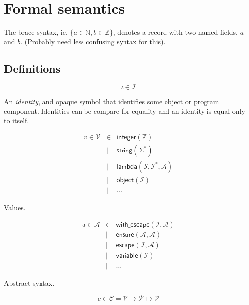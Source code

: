 \documentclass{article}
\begin{document}
\newcommand{\op}[1]{\mathsf{#1}}
\newcommand{\cnt}{c}
\newcommand{\scst}{\sigma}
\newcommand{\dyst}{\delta}
\newcommand{\pest}{\pi}
\newcommand{\sym}{\iota}
\newcommand{\prop}[1]{\mathsf{#1}}
\newcommand{\fun}[1]{\mathsf{#1}}
\newcommand{\type}[1]{\mathcal{#1}}
\newcommand{\val}[1]{\mathsf{#1}}
\newcommand{\eval}{\mathcal{E}}
\newcommand{\syn}[1]{\mathsf{#1}}
\newcommand{\bif}{\quad \mathbf{if} \quad}

\section{Formal semantics}

The brace syntax, ie. $\{ a \in \mathbb{N}, b \in \mathbb{Z} \}$, denotes a
record with two named fields, $a$ and $b$. (Probably need less confusing syntax
for this).

\subsection{Definitions}

\[ \iota \in \type{I} \]

An \emph{identity}, and opaque symbol that identifies some object or program
component. Identities can be compare for equality and an identity is equal only
to itself.

\begin{eqnarray*}
v \in \type{V}
& \in & \val{integer}(\mathbb{Z}) \\
& | & \val{string}(\Sigma^*) \\
& | & \val{lambda}(\type{S}, \type{I}^*, \type{A}) \\
& | & \val{object}(\type{I}) \\
& | & \ldots
\end{eqnarray*}

Values.

\begin{eqnarray*}
a \in \type{A}
& \in & \syn{with\_escape}(\type{I}, \type{A}) \\
& | & \syn{ensure}(\type{A}, \type{A}) \\
& | & \syn{escape}(\type{I}, \type{A}) \\
& | & \syn{variable}(\type{I}) \\
& | & \ldots
\end{eqnarray*}

Abstract syntax.

\[ \cnt \in \type{C} = \type{V} \mapsto \type{P} \mapsto \type{V} \]
\end{document}

